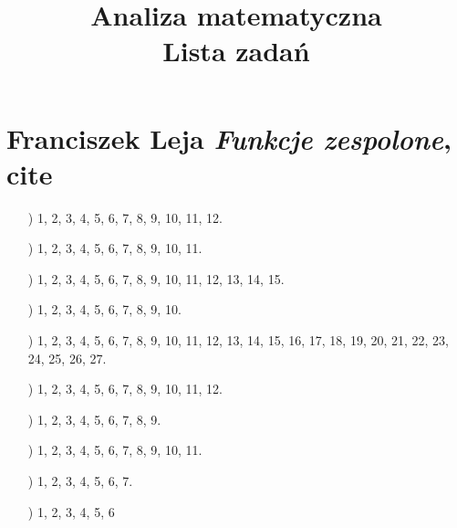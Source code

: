 \documentclass[a4paper,11pt]{article}
\title{Analiza matematyczna \\
  {\Large Lista zadań}}
\numberwithin{equation}{section}
\begin{document}





\maketitle





\section{Franciszek Leja \textit{Funkcje zespolone}, cite{}}

\label{sec:Oznaczenia-i-konwencje}


\begin{itemize}

\item[\romannumeral1)] 1, 2, 3, 4, 5, 6, 7, 8, 9, 10, 11, 12.

\item[\romannumeral2)] 1, 2, 3, 4, 5, 6, 7, 8, 9, 10, 11.

\item[\romannumeral3)] 1, 2, 3, 4, 5, 6, 7, 8, 9, 10, 11, 12, 13, 14, 15.

\item[\romannumeral4)] 1, 2, 3, 4, 5, 6, 7, 8, 9, 10.

\item[\romannumeral5)] 1, 2, 3, 4, 5, 6, 7, 8, 9, 10, 11, 12, 13, 14, 15,
  16, 17, 18, 19, 20, 21, 22, 23, 24, 25, 26, 27.

\item[\romannumeral6)] 1, 2, 3, 4, 5, 6, 7, 8, 9, 10, 11, 12.

\item[\romannumeral7)] 1, 2, 3, 4, 5, 6, 7, 8, 9.

\item[\romannumeral8)] 1, 2, 3, 4, 5, 6, 7, 8, 9, 10, 11.

\item[\romannumeral9)] 1, 2, 3, 4, 5, 6, 7.

\item[\romannumeral10)] 1, 2, 3, 4, 5, 6

\end{itemize}
\end{document}
